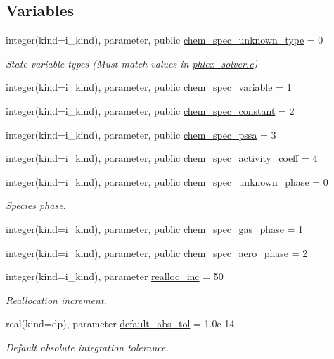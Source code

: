 \subsection*{Variables}
\begin{DoxyCompactItemize}
\item 
integer(kind=i\+\_\+kind), parameter, public \mbox{\hyperlink{namespacepmc__chem__spec__data_ae7eff771bed84dc4299dd62c51b815d4}{chem\+\_\+spec\+\_\+unknown\+\_\+type}} = 0
\begin{DoxyCompactList}\small\item\em State variable types (Must match values in \mbox{\hyperlink{phlex__solver_8c}{phlex\+\_\+solver.\+c}}) \end{DoxyCompactList}\item 
integer(kind=i\+\_\+kind), parameter, public \mbox{\hyperlink{namespacepmc__chem__spec__data_a4185155315475e6460a4e37385298daf}{chem\+\_\+spec\+\_\+variable}} = 1
\item 
integer(kind=i\+\_\+kind), parameter, public \mbox{\hyperlink{namespacepmc__chem__spec__data_a0bf400fe217f79a52fcf4d1cc19f1ddc}{chem\+\_\+spec\+\_\+constant}} = 2
\item 
integer(kind=i\+\_\+kind), parameter, public \mbox{\hyperlink{namespacepmc__chem__spec__data_adf3fa2aa29982546ef1d89f3587e97ca}{chem\+\_\+spec\+\_\+pssa}} = 3
\item 
integer(kind=i\+\_\+kind), parameter, public \mbox{\hyperlink{namespacepmc__chem__spec__data_a889aa5b1d886de2d985a0c159ed3cc07}{chem\+\_\+spec\+\_\+activity\+\_\+coeff}} = 4
\item 
integer(kind=i\+\_\+kind), parameter, public \mbox{\hyperlink{namespacepmc__chem__spec__data_a54930626ee81dd6c28d24dc6efd2f1f7}{chem\+\_\+spec\+\_\+unknown\+\_\+phase}} = 0
\begin{DoxyCompactList}\small\item\em Species phase. \end{DoxyCompactList}\item 
integer(kind=i\+\_\+kind), parameter, public \mbox{\hyperlink{namespacepmc__chem__spec__data_ac8acedb2cfaed6968979fc1cc59e76a6}{chem\+\_\+spec\+\_\+gas\+\_\+phase}} = 1
\item 
integer(kind=i\+\_\+kind), parameter, public \mbox{\hyperlink{namespacepmc__chem__spec__data_a1076e0bc8b754d3cf8e43333e92afc81}{chem\+\_\+spec\+\_\+aero\+\_\+phase}} = 2
\item 
integer(kind=i\+\_\+kind), parameter \mbox{\hyperlink{namespacepmc__chem__spec__data_a869f58a8ab2b2fa3818d101900a4a746}{realloc\+\_\+inc}} = 50
\begin{DoxyCompactList}\small\item\em Reallocation increment. \end{DoxyCompactList}\item 
real(kind=dp), parameter \mbox{\hyperlink{namespacepmc__chem__spec__data_a7e43218888c66701bf61abf475882116}{default\+\_\+abs\+\_\+tol}} = 1.\+0e-\/14
\begin{DoxyCompactList}\small\item\em Default absolute integration tolerance. \end{DoxyCompactList}\end{DoxyCompactItemize}


